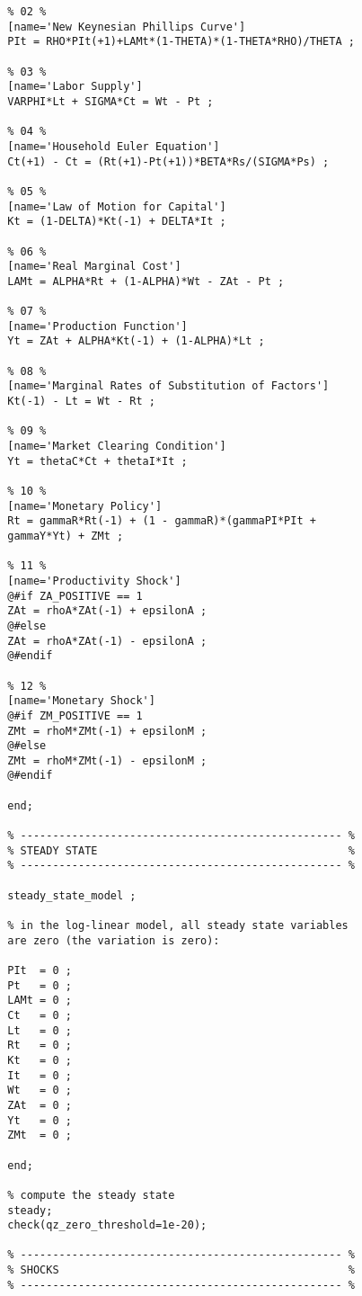 \documentclass[../thesis.tex]{subfiles}
\begin{document}
{\begin{verbatim}
		% 02 %
		[name='New Keynesian Phillips Curve']
		PIt = RHO*PIt(+1)+LAMt*(1-THETA)*(1-THETA*RHO)/THETA ;
		
		% 03 %
		[name='Labor Supply']
		VARPHI*Lt + SIGMA*Ct = Wt - Pt ;
		
		% 04 %
		[name='Household Euler Equation']
		Ct(+1) - Ct = (Rt(+1)-Pt(+1))*BETA*Rs/(SIGMA*Ps) ;
		
		% 05 %
		[name='Law of Motion for Capital']
		Kt = (1-DELTA)*Kt(-1) + DELTA*It ;
		
		% 06 %
		[name='Real Marginal Cost']
		LAMt = ALPHA*Rt + (1-ALPHA)*Wt - ZAt - Pt ;
		
		% 07 %
		[name='Production Function']
		Yt = ZAt + ALPHA*Kt(-1) + (1-ALPHA)*Lt ;
		
		% 08 %
		[name='Marginal Rates of Substitution of Factors']
		Kt(-1) - Lt = Wt - Rt ;
		
		% 09 %
		[name='Market Clearing Condition']
		Yt = thetaC*Ct + thetaI*It ;
		
		% 10 %
		[name='Monetary Policy']
		Rt = gammaR*Rt(-1) + (1 - gammaR)*(gammaPI*PIt + 
		gammaY*Yt) + ZMt ;
		
		% 11 %
		[name='Productivity Shock']
		@#if ZA_POSITIVE == 1
		ZAt = rhoA*ZAt(-1) + epsilonA ;
		@#else
		ZAt = rhoA*ZAt(-1) - epsilonA ;
		@#endif
		
		% 12 %
		[name='Monetary Shock']
		@#if ZM_POSITIVE == 1
		ZMt = rhoM*ZMt(-1) + epsilonM ;
		@#else
		ZMt = rhoM*ZMt(-1) - epsilonM ;
		@#endif
		
		end;
		
		% -------------------------------------------------- % 
		% STEADY STATE                                       %
		% -------------------------------------------------- % 
		
		steady_state_model ;
		
		% in the log-linear model, all steady state variables
		are zero (the variation is zero):
		
		PIt  = 0 ;
		Pt   = 0 ;
		LAMt = 0 ;
		Ct   = 0 ;
		Lt   = 0 ;
		Rt   = 0 ;
		Kt   = 0 ;
		It   = 0 ;
		Wt   = 0 ;
		ZAt  = 0 ;
		Yt   = 0 ;
		ZMt  = 0 ;
		
		end;
		
		% compute the steady state
		steady;
		check(qz_zero_threshold=1e-20);
		
		% -------------------------------------------------- % 
		% SHOCKS                                             %
		% -------------------------------------------------- % 
		

\end{verbatim}}
\end{document}
